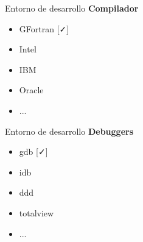 \begin{frame}[fragile]{Entorno de desarrollo}
  \textbf{Compilador}
  \begin{itemize}[<+(1)->]
    \item GFortran [{\color{green-600}\faCheck}]
    \item Intel
    \item IBM
    \item Oracle
    \item ...
  \end{itemize}
\end{frame}


\begin{frame}[fragile]{Entorno de desarrollo}
  \textbf{Debuggers}
  \begin{itemize}[<+(1)->]
    \item gdb [{\color{green-600}\faCheck}]
    \item idb
    \item ddd
    \item totalview
    \item ...
  \end{itemize}
\end{frame}
